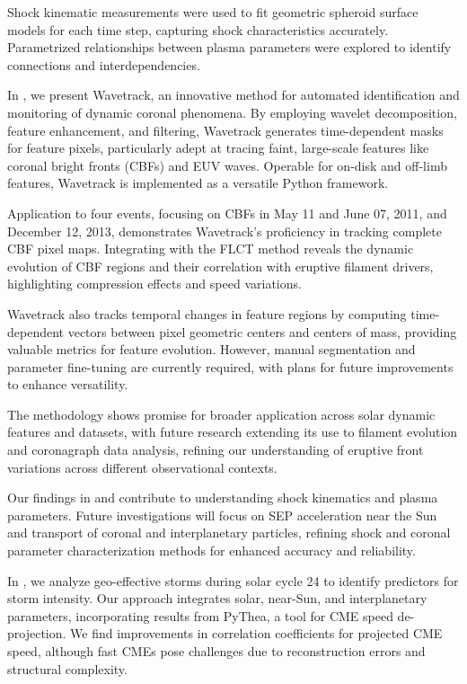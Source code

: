 Shock kinematic measurements were used to fit geometric spheroid surface models for each time step, capturing shock characteristics accurately. Parametrized relationships between plasma parameters were explored to identify connections and interdependencies.

In \citet{stepanyuk_2022}, we present Wavetrack, an innovative method for automated identification and monitoring of dynamic coronal phenomena. By employing wavelet decomposition, feature enhancement, and filtering, Wavetrack generates time-dependent masks for feature pixels, particularly adept at tracing faint, large-scale features like coronal bright fronts (CBFs) and EUV waves. Operable for on-disk and off-limb features, Wavetrack is implemented as a versatile Python framework.

Application to four events, focusing on CBFs in May 11 and June 07, 2011, and December 12, 2013, demonstrates Wavetrack's proficiency in tracking complete CBF pixel maps. Integrating with the FLCT method reveals the dynamic evolution of CBF regions and their correlation with eruptive filament drivers, highlighting compression effects and speed variations.

Wavetrack also tracks temporal changes in feature regions by computing time-dependent vectors between pixel geometric centers and centers of mass, providing valuable metrics for feature evolution. However, manual segmentation and parameter fine-tuning are currently required, with plans for future improvements to enhance versatility.

The methodology shows promise for broader application across solar dynamic features and datasets, with future research extending its use to filament evolution and coronagraph data analysis, refining our understanding of eruptive front variations across different observational contexts.

Our findings in \citet{kozarev_2022} and \citet{stepanyuk_2022} contribute to understanding shock kinematics and plasma parameters. Future investigations will focus on SEP acceleration near the Sun and transport of coronal and interplanetary particles, refining shock and coronal parameter characterization methods for enhanced accuracy and reliability.

In \citet{miteva_2023}, we analyze geo-effective storms during solar cycle 24 to identify predictors for storm intensity. Our approach integrates solar, near-Sun, and interplanetary parameters, incorporating results from PyThea, a tool for CME speed de-projection. We find improvements in correlation coefficients for projected CME speed, although fast CMEs pose challenges due to reconstruction errors and structural complexity.

